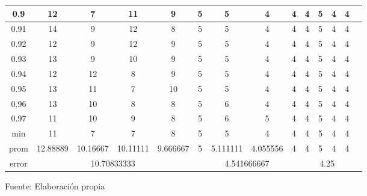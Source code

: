 \begin{center}
\begin{table}[H]
{\begin{tabular}{|c|c|c|c|c|c|c|c|c|c|c|c|c|c|}
\hline 
0.9 & 
12 & 7 & 11 & 9 & 5 & 5 & 4 & 4 & 4 & 5 & 4 & 4 \\
\hline 
0.91 & 
14 & 9 & 12 & 8 & 5 & 5 & 4 & 4 & 4 & 5 & 4 & 4 \\
\hline 
0.92 & 
12 & 9 & 12 & 9 & 5 & 5 & 4 & 4 & 4 & 5 & 4 & 4 \\
\hline 
0.93 & 
13 & 9 & 10 & 9 & 5 & 5 & 4 & 4 & 4 & 5 & 4 & 4 \\
\hline 
0.94 & 
12 & 12 & 8 & 9 & 5 & 5 & 4 & 4 & 4 & 5 & 4 & 4 \\
\hline 
0.95 & 
13 & 11 & 7 & 10 & 5 & 5 & 4 & 4 & 4 & 5 & 4 & 4 \\
\hline 
0.96 & 
13 & 10 & 8 & 8 & 5 & 6 & 4 & 4 & 4 & 5 & 4 & 4 \\
\hline 
0.97 & 
11 & 10 & 9 & 8 & 5 & 6 & 5 & 4 & 4 & 5 & 4 & 4 \\
\hline 
min & 
11 & 7 & 7 & 8 & 5 & 5 & 4 & 4 & 4 & 5 & 4 & 4 \\
\hline 
prom & 
12.88889 & 10.16667 & 10.11111 & 9.666667 & 5 & 5.111111 & 4.055556 & 4 & 4 & 5 & 4 & 4 \\
\hline 
error & 
\multicolumn{4}{c|}{10.70833333} & 
\multicolumn{4}{c|}{4.541666667} & 
\multicolumn{4}{c|}{4.25}\\ 
\hline 
\end{tabular} 
}
\begin{center}
\vskip 0.2cm
{\small{Fuente: Elaboración propia}}
\end{center}
\end{table}
\end{center}

\vskip -0.5cm

